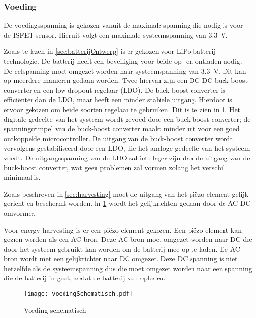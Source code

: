\subsubsection{Voeding} \label{sec:voeding}

De voedingsspanning is gekozen vanuit de maximale spanning die nodig is voor de ISFET sensor\cite{isfet}. Hieruit volgt een maximale systeemspanning van \qty{3.3}{\volt}.


Zoals te lezen in \cref{sec:batterijOntwerp} is er gekozen voor LiPo batterij technologie. De batterij heeft een beveiliging voor beide op- en ontladen nodig. De celspanning moet omgezet worden naar systeemspanning van \qty{3.3}{\volt}. Dit kan op meerdere manieren gedaan worden. Twee hiervan zijn een DC-DC buck-boost converter en een low dropout regelaar (LDO). De buck-boost converter is efficiënter dan de LDO, maar heeft een minder stabiele uitgang. Hierdoor is ervoor gekozen om beide soorten regelaar te gebruiken. Dit is te zien in \cref{fig:voedingSchematisch}. Het digitale gedeelte van het systeem wordt gevoed door een buck-boost converter; de spanningsrimpel van de buck-boost converter maakt minder uit voor een goed ontkoppelde microcontroller.
De uitgang van de buck-boost converter wordt vervolgens gestabiliseerd door een LDO, die het analoge gedeelte van het systeem voedt. De uitgangsspanning van de LDO zal iets lager zijn dan de uitgang van de buck-boost converter, wat geen problemen zal vormen zolang het verschil minimaal is.

Zoals beschreven in \cref{sec:harvesting} moet de uitgang van het piëzo-element gelijk gericht en beschermt worden. In \cref{fig:voedingSchematisch} wordt het gelijkrichten gedaan door de AC-DC omvormer.

Voor energy harvesting is er een piëzo-element gekozen. Een piëzo-element kan gezien worden als een AC bron. Deze AC bron moet omgezet worden naar DC die door het systeem gebruikt kan worden om de batterij mee op te laden. De AC bron wordt met een gelijkrichter naar DC omgezet. Deze DC spanning is niet hetzelfde als de systeemspanning dus die moet omgezet worden naar een spanning die de batterij in gaat, zodat de batterij kan opladen.

\begin{figure}[!htbp]
    \centering
    \texttt{[image: voedingSchematisch.pdf]}
    \caption{Voeding schematisch}
    \label{fig:voedingSchematisch}
\end{figure}




